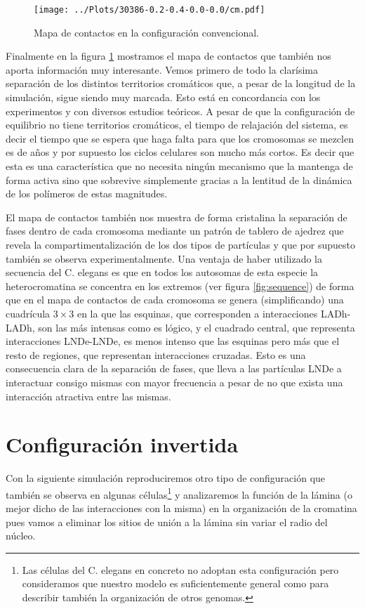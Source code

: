 \begin{figure}[t]
    \centering
    \texttt{[image: ../Plots/30386-0.2-0.4-0.0-0.0/cm.pdf]}
    \caption{Mapa de contactos en la configuración convencional.}
    \label{fig:cm_c}
\end{figure}

Finalmente en la figura \ref{fig:cm_c} mostramos el mapa de contactos que también nos aporta información muy interesante. Vemos primero de todo la clarísima separación de los distintos territorios cromáticos que, a pesar de la longitud de la simulación, sigue siendo muy marcada. Esto está en concordancia con los experimentos y con diversos estudios teóricos. A pesar de que la configuración de equilibrio no tiene territorios cromáticos, el tiempo de relajación del sistema, es decir el tiempo que se espera que haga falta para que los cromosomas se mezclen es de años \cite{Rosa2008} y por supuesto los ciclos celulares son mucho más cortos. Es decir que esta es una característica que no necesita ningún mecanismo que la mantenga de forma activa sino que sobrevive simplemente gracias a la lentitud de la dinámica de los polímeros de estas magnitudes.

El mapa de contactos también nos muestra de forma cristalina la separación de fases dentro de cada cromosoma mediante un patrón de tablero de ajedrez que revela la compartimentalización de los dos tipos de partículas y que por supuesto también se observa experimentalmente. Una ventaja de haber utilizado la secuencia del C. elegans es que en todos los autosomas de esta especie la heterocromatina se concentra en los extremos (ver figura \ref{fig:sequence}) de forma que en el mapa de contactos de cada cromosoma se genera (simplificando) una cuadrícula $3\times3$ en la que las esquinas, que corresponden a interacciones LADh-LADh, son las más intensas como es lógico, y el cuadrado central, que representa interacciones LNDe-LNDe, es menos intenso que las esquinas pero más que el resto de regiones, que representan interacciones cruzadas. Esto es una consecuencia clara de la separación de fases, que lleva a las partículas LNDe a interactuar consigo mismas con mayor frecuencia a pesar de no que exista una interacción atractiva entre las mismas.

\section{Configuración invertida}

Con la siguiente simulación reproduciremos otro tipo de configuración que también se observa en algunas células\footnote{Las células del C. elegans en concreto no adoptan esta configuración pero consideramos que nuestro modelo es suficientemente general como para describir también la organización de otros genomas.} y analizaremos la función de la lámina (o mejor dicho de las interacciones con la misma) en la organización de la cromatina pues vamos a eliminar los sitios de unión a la lámina sin variar el radio del núcleo.

